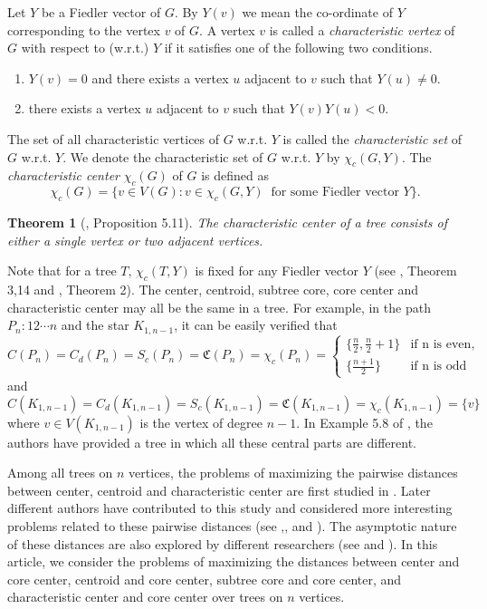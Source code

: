 \documentclass[11pt]{article}
\newtheorem{theorem}{Theorem}[section]
\begin{document}
Let $Y$ be a Fiedler vector of $G$. By $Y(v)$ we mean the co-ordinate of $Y$ corresponding to the vertex $v$ of $G$. A vertex $v$ is called a {\it characteristic vertex}  of $G$ with respect to (w.r.t.) $Y$ if it satisfies one of the following two conditions.
 \begin{enumerate}
 \item[$(i)$] $Y(v)=0$ and there exists a vertex $u$ adjacent to $v$ such that $Y(u)\neq 0$.
 \item[$(ii)$] there exists a vertex $u$ adjacent to $v$ such that $Y(v)Y(u)<0$.
 \end{enumerate}
 \noindent The set of all characteristic vertices of $G$ w.r.t. $Y$ is called the {\it characteristic set} of $G$ w.r.t. $Y$. We denote the characteristic set of $G$ w.r.t.  $Y$ by $\chi_c(G,Y)$. The {\it characteristic center} $\chi_c(G)$ of $G$ is defined as
$$\chi_c(G)=\{v\in V(G): v \in \chi_c(G,Y) \;\;\mbox{for some Fiedler vector $Y$}\}.$$

\begin{theorem}[\cite{Pandey3}, Proposition 5.11]\label{p and p}
The characteristic center of a tree consists of either a single vertex or two adjacent vertices.
\end{theorem}
Note that for a tree $T$, $\chi_c(T,Y)$ is fixed for any Fiedler vector $Y$ (see \cite{Fie2}, Theorem 3,14 and \cite{Rm}, Theorem 2). The center, centroid, subtree core, core center and characteristic center may all be the same in a tree. For example, in the path $P_n:12\cdots n$ and the star $K_{1,n-1}$, it can be easily verified  that 
\begin{equation*}\label{CMS_path}
C(P_n)=C_d(P_n)=S_c(P_n)=\mathfrak{C}(P_n)=\chi_c(P_n)=
\begin{cases}
\{{\frac{n}{2}},{\frac{n}{2}+1}\}  &\mbox{if n is even},\\ 
\{{\frac{n+1}{2}}\}   & \mbox{if n is odd}
\end{cases}
\end{equation*}
and 
\begin{equation*}\label{CMS_star}
C(K_{1,n-1})=C_d(K_{1,n-1})=S_c(K_{1,n-1})=\mathfrak{C}(K_{1,n-1})=\chi_c(K_{1,n-1})=\{v\}
\end{equation*}
\noindent where $v\in V(K_{1,n-1})$ is the vertex of degree $n-1$. In Example 5.8 of \cite{Pandey3}, the authors have provided a tree in which all these central parts are different. 

Among all trees on $n$ vertices, the problems of maximizing the pairwise distances between center, centroid and characteristic center are first studied in  \cite{Klp}. Later different authors have contributed to this study and considered more interesting problems related to these pairwise distances (see \cite{Des},\cite{Pandey2},\cite{Pandey4} and \cite{Hs}). The asymptotic nature of these distances are also explored by different researchers (see \cite{Na} and \cite{Pandey2}). In this article, we consider the problems of maximizing the distances between center and core center, centroid and core center, subtree core and core center, and characteristic center and core center over trees on $n$ vertices. 
\end{document}
